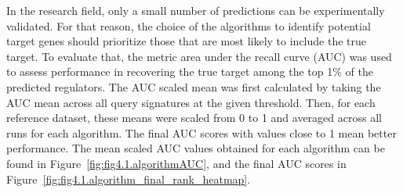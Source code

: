 In the research field, only a small number of predictions can be experimentally validated. For that reason, the choice of the algorithms to identify potential target genes should prioritize those that are most likely to include the true target. To evaluate that, the metric area under the recall curve (\gls{AUC}) was used to assess performance in recovering the true target among the top 1\% of the predicted regulators. The \gls{AUC} scaled mean was first calculated by taking the \gls{AUC} mean across all query signatures at the given threshold. Then, for each reference dataset, these means were scaled from 0 to 1 and averaged across all runs for each algorithm. The final \gls{AUC} scores with values close to 1 mean better performance. The mean scaled \gls{AUC} values obtained for each algorithm can be found in Figure~\ref{fig:fig4.1.algorithmAUC}, and the final \gls{AUC} scores in Figure~\ref{fig:fig4.1.algorithm_final_rank_heatmap}. 


